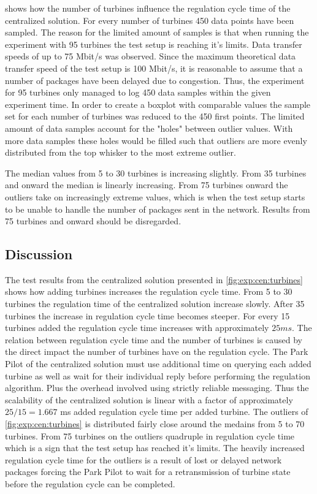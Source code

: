  shows how the number of turbines influence the regulation cycle time of the centralized solution.
For every number of turbines 450 data points have been sampled. The reason for the limited amount of samples is that when running the experiment with 95 turbines the test setup is reaching it's limits. Data transfer speeds of up to 75 Mbit/s was observed. Since the maximum theoretical data transfer speed of the test setup is 100 Mbit/s, it is reasonable to assume that a number of packages have been delayed due to congestion. Thus, the experiment for 95 turbines only managed to log 450 data samples within the given experiment time. In order to create a boxplot with comparable values the sample set for each number of turbines was reduced to the 450 first points.
The limited amount of data samples account for the "holes" between outlier values. With more data samples these holes would be filled such that outliers are more evenly distributed from the top whisker to the most extreme outlier.

The median values from 5 to 30 turbines is increasing slightly. From 35 turbines and onward the median is linearly increasing.
From 75 turbines onward the outliers take on increasingly extreme values, which is when the test setup starts to be unable to handle the number of packages sent in the network. Results from 75 turbines and onward should be disregarded.

\subsection{Discussion}
The test results from the centralized solution presented in \cref{fig:exp:cen:turbines} shows how adding turbines increases the regulation cycle time. From 5 to 30 turbines the regulation time of the centralized solution increase slowly. After 35 turbines the increase in regulation cycle time becomes steeper. For every 15 turbines added the regulation cycle time increases with approximately $25 ms$. The relation between regulation cycle time and the number of turbines is caused by the direct impact the number of turbines have on the regulation cycle. The Park Pilot of the centralized solution must use additional time on querying each added turbine as well as wait for their individual reply before performing the regulation algorithm. Plus the overhead involved using strictly reliable messaging. Thus the scalability of the centralized solution is linear with a factor of approximately $25 / 15 = 1.667$ ms added regulation cycle time per added turbine.
The outliers of \cref{fig:exp:cen:turbines} is distributed fairly close around the medains from 5 to 70 turbines. From 75 turbines on the outliers quadruple in regulation cycle time which is a sign that the test setup has reached it's limits. The heavily increased regulation cycle time for the outliers is a result of lost or delayed network packages forcing the Park Pilot to wait for a retransmission of turbine state before the regulation cycle can be completed.

